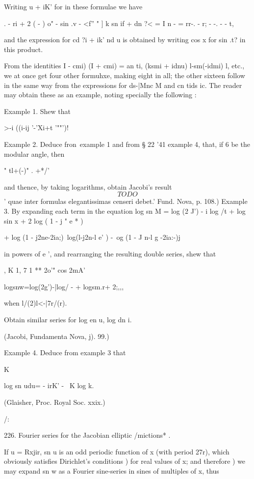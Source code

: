 Writing u + iK' for in these formulae we have

. - ri + 2  ( - ) o" - sin .v - <f'' " ] k sn if + dn ?< = I n - =
rr-. - r; - -. - - t,

and the expression for cd ?i + ik' nd u is obtained by writing cos x
for sin .t? in this product.

From the identities I - cmi) (I + cmi) = an ti, (ksmi + idnu)
l-sm(-idmi) l, etc., we at once get four other formuhxe, making eight
in all; the other sixteen follow in the same way from the expressions
for ds-|Mnc M and cn tids ic. The reader may obtain these as an
example, noting specially the following :

Example 1. Shew that

  >-i ((i-ij '-'Xi+t '""')!

Example 2. Deduce fron\ example 1 and from § 22 '41 example 4, that,
if 6 be the modular angle, then

" tl+(-)" . +*/'

and thence, by taking logarithms, obtain Jacobi's result
$$
TODO
$$
' quae inter formulas elegantissimas censeri debet.' Fund. Nova, p.
108.) Example 3. By expanding each term in the equation log sn M = log
(2 J') - i log /t + log sin x + 2 log ( 1 - j " e * )

+ log (1 - j2ne-2ia;)\ log(l-j2n-l e' ) -\ og (1 - J n-l g -2ia:-)j

in powers of e ', and rearranging the resulting double series, shew
that

, K 1, 7 1  ** 2o'" cos 2mA'

logsnw=log(2g')-|log/ - + logsm.r+ 2;,,,

when l/(2)l<-|7r/(r).

Obtain similar series for log en u, log dn i.

(Jacobi, Fundamenta Nova, j). 99.)

Example 4. Deduce from example 3 that

 K

log sn udu= - irK' - \ K log k.

(Glaisher, Proc. Royal Soc. xxix.)

/:

%
%

226. Fourier series for the Jacobian elliptic /mictions* .

If u = Rxjir, sn u is an odd periodic function of x (with period 27r),
which obviously satisfies Dirichlet's conditions ) for real
values of x; and therefore ) we may expand sn w as a Fourier
sine-series in sines of multiples of x, thus

